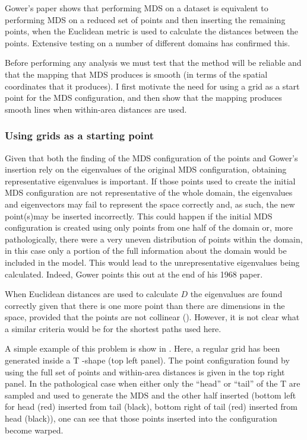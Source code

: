 Gower's paper shows that performing MDS on a dataset is equivalent to performing MDS on a reduced set of points and then inserting the remaining points, when the Euclidean metric is used to calculate the distances between the points. Extensive testing on a number of different domains has confirmed this.

Before performing any analysis we must test that the method will be reliable and that the mapping that MDS produces is smooth (in terms of the spatial coordinates that it produces). I first motivate the need for using a grid as a start point for the MDS configuration, and then show that the mapping produces smooth lines when within-area distances are used.

\subsubsection{Using grids as a starting point}
\label{grids}
Given that both the finding of the MDS configuration of the points and Gower's insertion rely on the eigenvalues of the original MDS configuration, obtaining representative eigenvalues is important. If those points used to create the initial MDS configuration are not representative of the whole domain, the eigenvalues and eigenvectors may fail to represent the space correctly and, as such, the new point(s)may be inserted incorrectly. This could happen if the initial MDS configuration is created using only points from one half of the domain or, more pathologically, there were a very uneven distribution of points within the domain, in this case only a portion of the full information about the domain would be included in the model. This would lead to the unrepresentative eigenvalues being calculated. Indeed, Gower points this out at the end of his 1968 paper.

When Euclidean distances are used to calculate $D$ the eigenvalues are found correctly given that there is one more point than there are dimensions in the space, provided that the points are not collinear (\cite{landmark}). However, it is not clear what a similar criteria would be for the shortest paths used here. 

A simple example of this problem is show in . Here, a regular grid has been generated inside a T -shape (top left panel). The point configuration found by using the full set of points and within-area distances is given in the top right panel. In the pathological case when either only the ``head'' or ``tail'' of the T are sampled and used to generate the MDS and the other half inserted (bottom left for head (red) inserted from tail (black), bottom right of tail (red) inserted from head (black)), one can see that those points inserted into the configuration become warped. 

